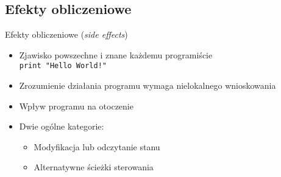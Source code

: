 \documentclass{beamer}
\begin{document}
\subsection{Efekty obliczeniowe}
\begin{frame}{Efekty obliczeniowe (\textit{side effects})}
  \begin{itemize}
    \item Zjawisko powszechne i znane każdemu programiście \\
    \texttt{print "Hello World!"}
    \item Zrozumienie działania programu wymaga nielokalnego wnioskowania
    \item Wpływ programu na otoczenie
    \item Dwie ogólne kategorie:
    \begin{itemize}
      \item Modyfikacja lub odczytanie stanu 
      \item Alternatywne ścieżki sterowania 
    \end{itemize}
  \end{itemize}
\end{frame}
\end{document}

